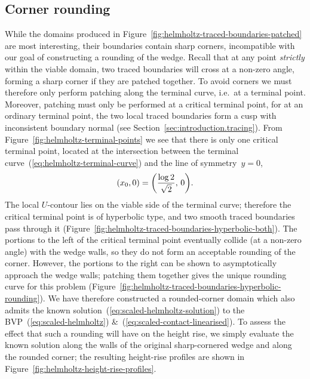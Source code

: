 \subsection{Corner rounding}
\label{sec:moderate.linearised.rounding}

While the domains produced in
Figure~\ref{fig:helmholtz-traced-boundaries-patched}
are most interesting,
their boundaries contain sharp corners,
incompatible with our goal of constructing a rounding of the wedge.
Recall that at any point \emph{strictly} within the viable domain,
two traced boundaries will cross at a non-zero angle,
forming a sharp corner if they are patched together.
To avoid corners we must therefore only perform patching
along the terminal curve, i.e.~at a terminal point.
Moreover, patching must only be performed at a critical terminal point,
for at an ordinary terminal point,
the two local traced boundaries form a cusp with inconsistent boundary normal
(see Section~\ref{sec:introduction.tracing}).
From Figure~\ref{fig:helmholtz-terminal-points}
we see that there is only one critical terminal point,
located at the intersection between
the terminal curve~(\ref{eq:helmholtz-terminal-curve})
and the line of symmetry~$y = 0$,
\begin{equation}
  (x_0, 0) = \roundbr*{\frac{\log 2}{\sqrt{2}}, \, 0}.
  \label{eq:helmholtz-critical-terminal-point}
\end{equation}
The local $U$-contour lies on the viable side of the terminal curve;
therefore the critical terminal point is of hyperbolic type,
and two smooth traced boundaries pass through it
(Figure~\ref{fig:helmholtz-traced-boundaries-hyperbolic-both}).
The portions to the left of the critical terminal point
eventually collide (at a non-zero angle) with the wedge walls,
so they do not form an acceptable rounding of the corner.
However, the portions to the right
can be shown to asymptotically approach the wedge walls;
patching them together gives the unique rounding curve for this problem
(Figure~\ref{fig:helmholtz-traced-boundaries-hyperbolic-rounding}).
We have therefore constructed a rounded-corner domain
which also admits the known solution~(\ref{eq:scaled-helmholtz-solution})
to the BVP~(\ref{eq:scaled-helmholtz})
\&~(\ref{eq:scaled-contact-linearised}).
To assess the effect that such a rounding will have
on the height rise,
we simply evaluate the known solution
along the walls of the original sharp-cornered wedge
and along the rounded corner;
the resulting height-rise profiles are shown in
Figure~\ref{fig:helmholtz-height-rise-profiles}.

